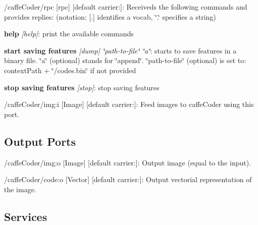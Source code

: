 \begin{DoxyItemize}
\item /caffe\+Coder/rpc \mbox{[}rpc\mbox{]} \mbox{[}default carrier\+:\mbox{]}\+: Receiveds the following commands and provides replies\+: (notation\+: \mbox{[}.\mbox{]} identifies a vocab, \char`\"{}.\char`\"{} specifies a string)
\begin{DoxyEnumerate}
\item {\bfseries{help}} {\itshape \mbox{[}help\mbox{]}}\+: print the available commands
\item {\bfseries{start saving features}} {\itshape \mbox{[}dump\mbox{]} \char`\"{}path-\/to-\/file\char`\"{} \char`\"{}a\char`\"{}}\+: starts to save features in a binary file. \char`\"{}a\char`\"{} (optional) stands for \char`\"{}append\char`\"{}. \char`\"{}path-\/to-\/file\char`\"{} (optional) is set to\+: context\+Path + \char`\"{}/codes.\+bin\char`\"{} if not provided
\item {\bfseries{stop saving features}} {\itshape \mbox{[}stop\mbox{]}}\+: stop saving features
\end{DoxyEnumerate}
\item /caffe\+Coder/img\+:i \mbox{[}Image\mbox{]} \mbox{[}default carrier\+:\mbox{]}\+: Feed images to caffe\+Coder using this port.
\end{DoxyItemize}\hypertarget{group__GIECoder_outputports_sec}{}\subsection{Output Ports}\label{group__GIECoder_outputports_sec}

\begin{DoxyItemize}
\item /caffe\+Coder/img\+:o \mbox{[}Image\mbox{]} \mbox{[}default carrier\+:\mbox{]}\+: Output image (equal to the input).
\item /caffe\+Coder/code\+:o \mbox{[}Vector\mbox{]} \mbox{[}default carrier\+:\mbox{]}\+: Output vectorial representation of the image.
\end{DoxyItemize}\hypertarget{group__GIECoder_services_sec}{}\subsection{Services}\label{group__GIECoder_services_sec}

